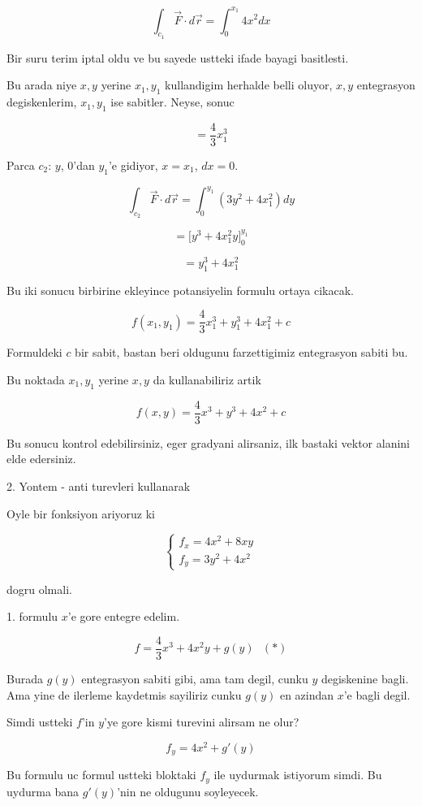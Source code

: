 \documentclass[12pt,fleqn]{article}
\begin{document}
\[ \int_{c_1} \vec{F} \cdot d\vec{r} = 
\int_0^{x_1} 4x^2 dx 
\]

Bir suru terim iptal oldu ve bu sayede ustteki ifade bayagi basitlesti. 

Bu arada niye $x,y$ yerine $x_1,y_1$ kullandigim herhalde belli oluyor,
$x,y$ entegrasyon degiskenlerim, $x_1,y_1$ ise sabitler. Neyse, sonuc

\[ = \frac{4}{3} x_1^3\]

Parca $c_2$: $y$, 0'dan $y_1$'e gidiyor, $x=x_1$, $dx = 0$. 

\[ \int_{c_2} \vec{F} \cdot d\vec{r} = 
\int_0^{y_1} (3y^2 + 4x_1^2) dy
\]

\[ = \bigg[ y^3 + 4x_1^2y \bigg]_0^{y_1} \]


\[ = y_1^3 + 4x_1^2 \]

Bu iki sonucu birbirine ekleyince potansiyelin formulu ortaya cikacak.

\[ f(x_1,y_1) = \frac{4}{3} x_1^3 + y_1^3 + 4x_1^2 + c\]

Formuldeki $c$ bir sabit, bastan beri oldugunu farzettigimiz entegrasyon
sabiti bu. 

Bu noktada $x_1,y_1$ yerine $x,y$ da kullanabiliriz artik

\[ f(x,y) = \frac{4}{3} x^3 + y^3 + 4x^2 + c\]

Bu sonucu kontrol edebilirsiniz, eger gradyani alirsaniz, ilk bastaki
vektor alanini elde edersiniz. 

2. Yontem - anti turevleri kullanarak

Oyle bir fonksiyon ariyoruz ki 

\[ 
\left\{ \begin{array}{l}
f_x = 4x^2 + 8xy \\
f_y = 3y^2 + 4x^2
\end{array} \right.
 \]

dogru olmali. 

1. formulu $x$'e gore entegre edelim. 

\[ f = \frac{4}{3}x^3 + 4x^2y + g(y) \ \ \ (*)\]

Burada $g(y)$ entegrasyon sabiti gibi, ama tam degil, cunku $y$ degiskenine
bagli. Ama yine de ilerleme kaydetmis sayiliriz cunku $g(y)$ en azindan
$x$'e bagli degil. 

Simdi ustteki $f$'in $y$'ye gore kismi turevini alirsam ne olur? 

\[ f_y = 4x^2 + g'(y) \]

Bu formulu uc formul ustteki bloktaki $f_y$ ile uydurmak istiyorum
simdi. Bu uydurma bana $g'(y)$'nin ne oldugunu soyleyecek. 
\end{document}
